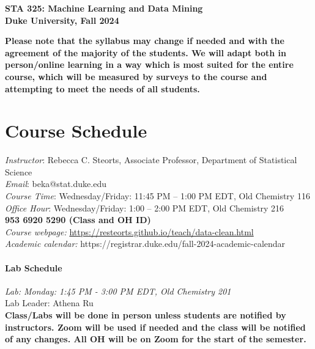 \documentclass[11pt]{article}
\date{}
\begin{document}
\begin{center}
{\Large\bf STA 325: Machine Learning and Data Mining} \\

{\Large\bf Duke University, Fall 2024} \\
\end{center}

\textbf{Please note that the syllabus may change if needed and with the agreement of the majority of the students. We will adapt both in person/online learning in a way which is most suited for the entire course, which will be measured by surveys to the course and attempting to meet the needs of all students.} \\

\section{Course Schedule}
\emph{Instructor}: Rebecca C. Steorts,  Associate Professor,  Department of Statistical Science\\
\emph{Email}: beka@stat.duke.edu\\
\emph{Course Time}: Wednesday/Friday: 11:45 PM -- 1:00 PM EDT, Old Chemistry 116 \\
\emph{Office Hour}: Wednesday/Friday: 1:00 -- 2:00 PM EDT, Old Chemistry 216\\
\textbf{953 6920 5290 (Class and OH ID)}\\
\emph{Course webpage:} \url{https://resteorts.github.io/teach/data-clean.html} \\
\emph{Academic calendar:} https://registrar.duke.edu/fall-2024-academic-calendar 

\vspace*{1em}

\paragraph{Lab Schedule} 

\emph{Lab: Monday: 1:45 PM - 3:00 PM EDT, Old Chemistry 201}\\ Lab Leader: Athena Ru \\


\textbf{Class/Labs will be done in person unless students are notified by instructors. Zoom will be used if needed and the class will be notified of any changes. All OH will be on Zoom for the start of the semester.}
\end{document}

